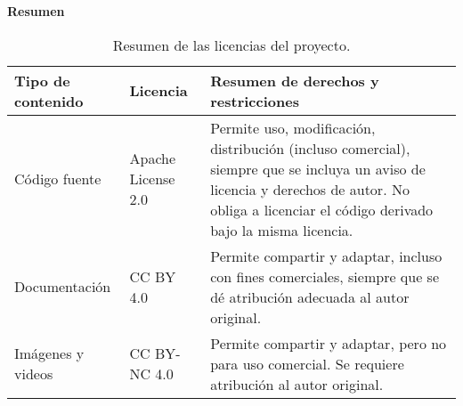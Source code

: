 \textbf{Resumen}

\begin{table}[H]
    \centering
    \begin{tabular}{|p{}|p{}|p{}|}
        \hline
        \textbf{Tipo de contenido} & \textbf{Licencia} & \textbf{Resumen de derechos y restricciones} \\
        \hline
        Código fuente & Apache License 2.0 & Permite uso, modificación, distribución (incluso comercial), siempre que se incluya un aviso de licencia y derechos de autor. No obliga a licenciar el código derivado bajo la misma licencia. \\
        \hline
        Documentación & CC BY 4.0 & Permite compartir y adaptar, incluso con fines comerciales, siempre que se dé atribución adecuada al autor original. \\
        \hline
        Imágenes y videos & CC BY-NC 4.0 & Permite compartir y adaptar, pero no para uso comercial. Se requiere atribución al autor original. \\
        \hline
    \end{tabular}
    \vspace{0.3em}
    \caption{Resumen de las licencias del proyecto.}
    \label{tab:licencias_contenido}
\end{table}
